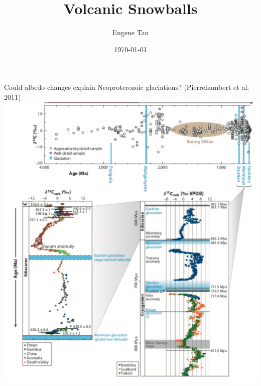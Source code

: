 \documentclass[11pt]{beamer}
\begin{document}

\title[Volcanic Snowball Earth]{Volcanic Snowballs}
\author{Eugene Tan}
\date{\today}


\begin{frame}{Could albedo changes explain Neoproterozoic glaciations? (Pierrehumbert et al. 2011)}
    \centering
    \includegraphics[width=.8\textwidth,height=.85\textheight,keepaspectratio]{img/pierrehumbert.png}
\end{frame}
\end{document}
